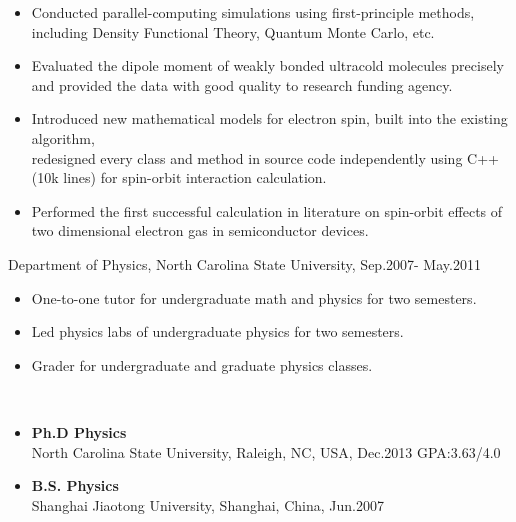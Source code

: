 \documentclass[11pt]{article} %
\begin{document}
\begin{itemize}
  \item Conducted parallel-computing simulations using first-principle methods, including Density Functional Theory, Quantum Monte Carlo, etc.\\
\vspace{-4mm}
   \item Evaluated the dipole moment of weakly bonded ultracold molecules precisely and provided
the data with good quality to research funding agency.\\
\vspace{-4mm}
  \item Introduced new mathematical models for electron spin, built into the existing algorithm,\\
  redesigned every class and method in source code independently using C++(10k lines) for spin-orbit interaction calculation.\\

\vspace{-4mm}
   \item Performed the first successful calculation in literature on spin-orbit effects of two dimensional electron gas in semiconductor devices.\\
\end{itemize}
\vspace{-3mm}
 Department of Physics, North Carolina State University, Sep.2007- May.2011\\
\begin{itemize}
	\item One-to-one tutor for undergraduate math and physics for two semesters.\\
\vspace{-4mm}
	\item Led physics labs of undergraduate physics for two semesters.\\
\vspace{-4mm}
	\item Grader for undergraduate and graduate physics classes.\\
\end{itemize}

 \\
\vspace{-5mm}
\begin{itemize}
  \item {\bf Ph.D Physics} \hspace{100mm}   \\
    North Carolina State University, Raleigh, NC, USA, Dec.2013 \hspace*{2mm} GPA:3.63/4.0\\
\vspace{-4mm}
  \item {\bf B.S. Physics}\\
    Shanghai Jiaotong University, Shanghai, China, Jun.2007\\
\vspace{0mm}
\end{itemize}
\end{document}
